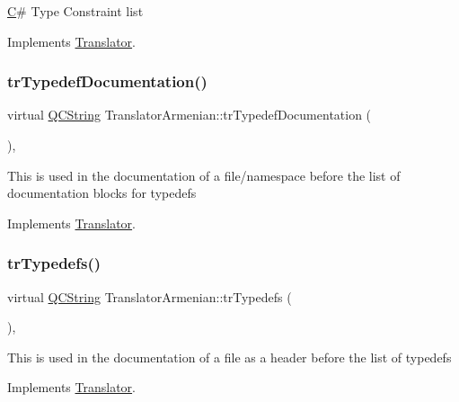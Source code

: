 \mbox{\hyperlink{class_c}{C}}\# Type Constraint list 

Implements \mbox{\hyperlink{class_translator}{Translator}}.

\mbox{\label{class_translator_armenian_a09b0f592bbe62f1216abe338932072f4}} 
\subsubsection{\texorpdfstring{trTypedefDocumentation()}{trTypedefDocumentation()}}
{\footnotesize\ttfamily virtual \mbox{\hyperlink{class_q_c_string}{Q\+C\+String}} Translator\+Armenian\+::tr\+Typedef\+Documentation (\begin{DoxyParamCaption}{ }\end{DoxyParamCaption})\hspace{0.3cm}{\ttfamily [inline]}, {\ttfamily [virtual]}}

This is used in the documentation of a file/namespace before the list of documentation blocks for typedefs 

Implements \mbox{\hyperlink{class_translator}{Translator}}.

\mbox{\label{class_translator_armenian_a9293b7e17796376f1701282fe9a01010}} 
\subsubsection{\texorpdfstring{trTypedefs()}{trTypedefs()}}
{\footnotesize\ttfamily virtual \mbox{\hyperlink{class_q_c_string}{Q\+C\+String}} Translator\+Armenian\+::tr\+Typedefs (\begin{DoxyParamCaption}{ }\end{DoxyParamCaption})\hspace{0.3cm}{\ttfamily [inline]}, {\ttfamily [virtual]}}

This is used in the documentation of a file as a header before the list of typedefs 

Implements \mbox{\hyperlink{class_translator}{Translator}}.

\mbox{\label{class_translator_armenian_a83846a206b8f7eadca17af77bb25acdb}} 
